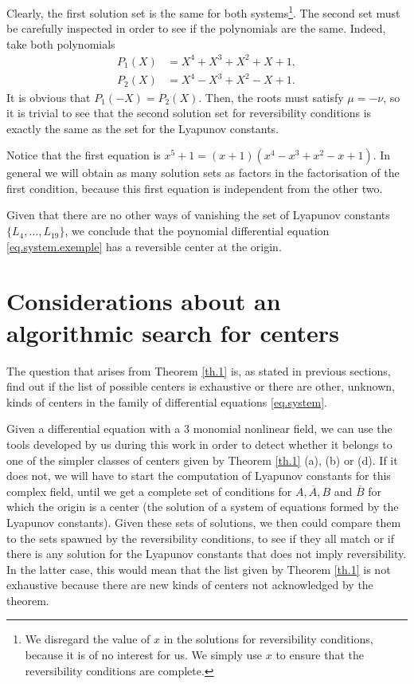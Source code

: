 Clearly, the first solution set is the same for both systems\footnote{We disregard the value of $x$ in the solutions for reversibility conditions, because it is of no interest for us. We simply use $x$ to ensure that the reversibility conditions are complete.}. The second set must be carefully inspected in order to see if the polynomials are the same. Indeed, take both polynomials
\begin{align*}
P_1(X) &= X^4+X^3+X^2+X+1,\\
P_2(X) &= X^4-X^3+X^2-X+1.
\end{align*}
It is obvious that $P_1(-X)=P_2(X)$. Then, the roots must satisfy $\mu=-\nu$, so it is trivial to see that the second solution set for reversibility conditions is exactly the same as the set for the Lyapunov constants.
\begin{observacio}
Notice that the first equation is $x^5+1=(x+1)(x^4-x^3+x^2-x+1)$. In general we will obtain as many solution sets as factors in the factorisation of the first condition, because this first equation is independent from the other two.
\end{observacio}
Given that there are no other ways of vanishing the set of Lyapunov constants $\{L_4,\dots,L_{19}\}$, we conclude that the poynomial differential equation \eqref{eq.system.exemple} has a reversible center at the origin.






\section{Considerations about an algorithmic search for centers}

The question that arises from Theorem \ref{th.1} is, as stated in previous sections, find out if the list of possible centers is exhaustive or there are other, unknown, kinds of centers in the family of differential equations \eqref{eq.system}.

Given a differential equation with a 3 monomial nonlinear field, we can use the tools developed by us during this work in order to detect whether it belongs to one of the simpler classes of centers given by Theorem \ref{th.1} (a), (b) or (d). If it does not, we will have to start the computation of Lyapunov constants for this complex field, until we get a complete set of conditions for $A,\overline A,B$ and $\overline B$ for which the origin is a center (the solution of a system of equations formed by the Lyapunov constants). Given these sets of solutions, we then could compare them to the sets spawned by the reversibility conditions, to see if they all match or if there is any solution for the Lyapunov constants that does not imply reversibility. In the latter case, this would mean that the list given by Theorem \ref{th.1} is not exhaustive because there are new kinds of centers not acknowledged by the theorem.

